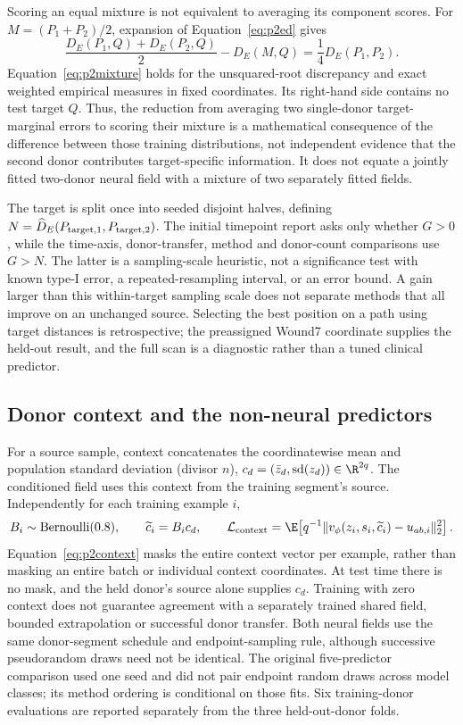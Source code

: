 Scoring an equal mixture is not equivalent to averaging its component scores. For $M=(P_1+P_2)/2$, expansion of Equation~\eqref{eq:p2ed} gives
\begin{equation}
\frac{D_E(P_1,Q)+D_E(P_2,Q)}{2}-D_E(M,Q)=\frac14D_E(P_1,P_2).\label{eq:p2mixture}
\end{equation}
Equation~\eqref{eq:p2mixture} holds for the unsquared-root discrepancy and exact weighted empirical measures in fixed coordinates. Its right-hand side contains no test target $Q$. Thus, the reduction from averaging two single-donor target-marginal errors to scoring their mixture is a mathematical consequence of the difference between those training distributions, not independent evidence that the second donor contributes target-specific information. It does not equate a jointly fitted two-donor neural field with a mixture of two separately fitted fields.

The target is split once into seeded disjoint halves, defining $N=\widehat D_E(P_{\rm target,1},P_{\rm target,2})$. The initial timepoint report asks only whether $G>0$, while the time-axis, donor-transfer, method and donor-count comparisons use $G>N$. The latter is a sampling-scale heuristic, not a significance test with known type-I error, a repeated-resampling interval, or an error bound. A gain larger than this within-target sampling scale does not separate methods that all improve on an unchanged source. Selecting the best position on a path using target distances is retrospective; the preassigned Wound7 coordinate supplies the held-out result, and the full scan is a diagnostic rather than a tuned clinical predictor.

\subsection{Donor context and the non-neural predictors}
For a source sample, context concatenates the coordinatewise mean and population standard deviation (divisor $n$), $c_d=(\bar z_d,\operatorname{sd}(z_d))\in\R^{2q}$. The conditioned field uses this context from the training segment's source. Independently for each training example $i$,
\begin{equation}
B_i\sim\operatorname{Bernoulli}(0.8),\qquad \widetilde c_i=B_i c_d,\qquad
\mathcal L_{\rm context}=\E\!\left[q^{-1}\|v_\phi(z_i,s_i,\widetilde c_i)-u_{ab,i}\|_2^2\right].\label{eq:p2context}
\end{equation}
Equation~\eqref{eq:p2context} masks the entire context vector per example, rather than masking an entire batch or individual context coordinates. At test time there is no mask, and the held donor's source alone supplies $c_d$. Training with zero context does not guarantee agreement with a separately trained shared field, bounded extrapolation or successful donor transfer. Both neural fields use the same donor-segment schedule and endpoint-sampling rule, although successive pseudorandom draws need not be identical. The original five-predictor comparison used one seed and did not pair endpoint random draws across model classes; its method ordering is conditional on those fits. Six training-donor evaluations are reported separately from the three held-out-donor folds.

